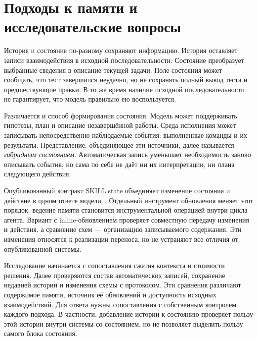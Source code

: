\section{Подходы к памяти и исследовательские вопросы}
\label{sec:background}
История и состояние по-разному сохраняют информацию. История оставляет записи взаимодействия в исходной последовательности. Состояние преобразует выбранные сведения в описание текущей задачи. Поле состояния может сообщать, что тест завершился неудачно, но не сохранять полный вывод теста и предшествующие правки. В то же время наличие исходной последовательности не гарантирует, что модель правильно ею воспользуется.

Различается и способ формирования состояния. Модель может поддерживать гипотезы, план и описание незавершённой работы. Среда исполнения может записывать непосредственно наблюдаемые события: выполненные команды и их результаты. Представление, объединяющее эти источники, далее называется \emph{гибридным состоянием}. Автоматическая запись уменьшает необходимость заново описывать события, но сама по себе не даёт ни их интерпретации, ни плана следующего действия.

Опубликованный контракт SKILL.state объединяет изменение состояния и действие в одном ответе модели~\citep{skillstate2026}. Отдельный инструмент обновления меняет этот порядок: ведение памяти становится инструментальной операцией внутри цикла агента. Вариант с inline-обновлением проверяет совместную передачу изменения и действия, а сравнение схем --- организацию записываемого содержания. Эти изменения относятся к реализации переноса, но не устраняют все отличия от опубликованной системы.

Исследование начинается с сопоставления сжатия контекста и стоимости решения. Далее проверяются состав автоматических записей, сохранение недавней истории и изменения схемы с протоколом. Эти сравнения различают содержимое памяти, источник её обновлений и доступность исходных взаимодействий. Для ответа нужны сопоставления с собственным контролем каждого подхода. В частности, добавление истории к состоянию проверяет пользу этой истории внутри системы со состоянием, но не позволяет выделить пользу самого блока состояния.
